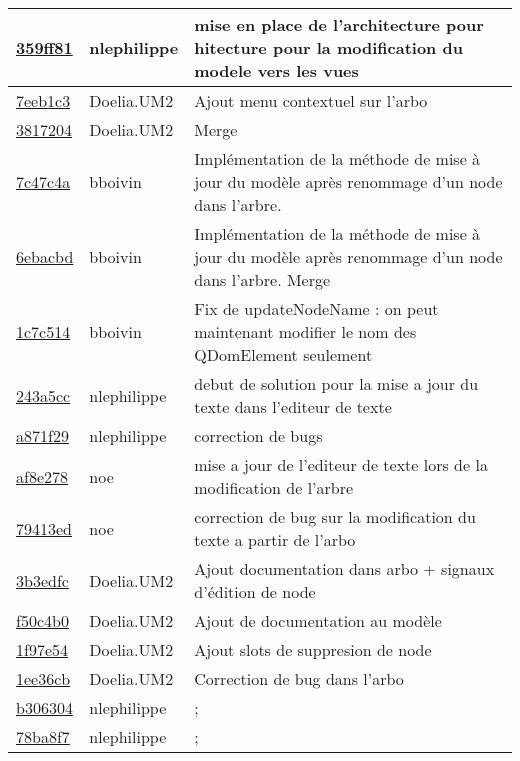 \begin{tabular}{l l l}
\href{359ff81bc610b5ebcfc557c302df049b821f31af}{359ff81} & nlephilippe & mise en place de l'architecture pour hitecture pour la modification du modele vers les vues\\\hline
\href{7eeb1c3d865307c3e35db972073d8bc64400e649}{7eeb1c3} & Doelia.UM2 & Ajout menu contextuel sur l'arbo\\\hline
\href{3817204665fa3b9c6148ecacf82efba4aacb6e62}{3817204} & Doelia.UM2 & Merge\\\hline
\href{7c47c4a01f52346eba7b66a1ca769520d50f6157}{7c47c4a} & bboivin & Implémentation de la méthode de mise à jour du modèle après renommage d'un node dans l'arbre.\\\hline
\href{6ebacbd568833e3217d77dfd9963a6a48b431913}{6ebacbd} & bboivin & Implémentation de la méthode de mise à jour du modèle après renommage d'un node dans l'arbre. Merge\\\hline
\href{1c7c514e86e5eb066094fc268e1a48cb6d6611fc}{1c7c514} & bboivin & Fix de updateNodeName : on peut maintenant modifier le nom des QDomElement seulement\\\hline
\href{243a5ccfa3e0e308c3ccd8b974ce02b46046d052}{243a5cc} & nlephilippe & debut de solution pour la mise a jour du texte dans l'editeur de texte\\\hline
\href{a871f295251bd9635e21288b4dd0a9896051b6cc}{a871f29} & nlephilippe & correction de bugs\\\hline
\href{af8e278e031354e803ecdb9127a213fc381d5333}{af8e278} & noe & mise a jour de l'editeur de texte lors de la modification de l'arbre\\\hline
\href{79413edd277d5baa28693c7a20e8edf37f037c92}{79413ed} & noe & correction de bug sur la modification du texte a partir de l'arbo\\\hline
\href{3b3edfc728c79122627eb7bc8ddb8e4e8386a9e1}{3b3edfc} & Doelia.UM2 & Ajout documentation dans arbo + signaux d'édition de node\\\hline
\href{f50c4b0aa31d2b2edc43f58edf90673b2d4798ab}{f50c4b0} & Doelia.UM2 & Ajout de documentation au modèle\\\hline
\href{1f97e54c1cd33fd4e7606ced8ac5004cab830ec8}{1f97e54} & Doelia.UM2 & Ajout slots de suppresion de node\\\hline
\href{1ee36cb1fa03308e74f288ba6b5c8b3a6993d93a}{1ee36cb} & Doelia.UM2 & Correction de bug dans l'arbo\\\hline
\href{b3063046653ffc3f8a6aa23c4e6d8907a28ad148}{b306304} & nlephilippe & ;\\\hline
\href{78ba8f740eadd4a0c98867082855f948d3b5b264}{78ba8f7} & nlephilippe & ;\\\hline

\end{tabular}
